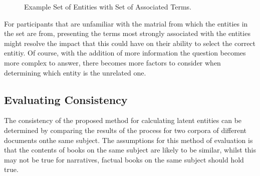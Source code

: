 \documentclass[10pt]{report}
\begin{document}
\begin{figure}
  \centering
  \caption{Example Set of Entities with Set of Associated Terms.\label{fig:intruding_entitiy_terms}}
\end{figure}

For participants that are unfamiliar with the matrial from which the entities in the set are from, presenting the terms most strongly associated with the entities might resolve the impact that this could have on their ability to select the correct entitiy. Of course, with the addition of more information the question becomes more complex to answer, there becomes more factors to consider when determining which entity is the unrelated one.


\subsection{Evaluating Consistency}
The consistency of the proposed method for calculating latent entities can be determined by comparing the results of the process for two corpora of different documents onthe same subject. The assumptions for this method of evaluation is that the contents of books on the same subject are likely to be similar, whilst this may not be true for narratives, factual books on the same subject should hold true.
\end{document}
